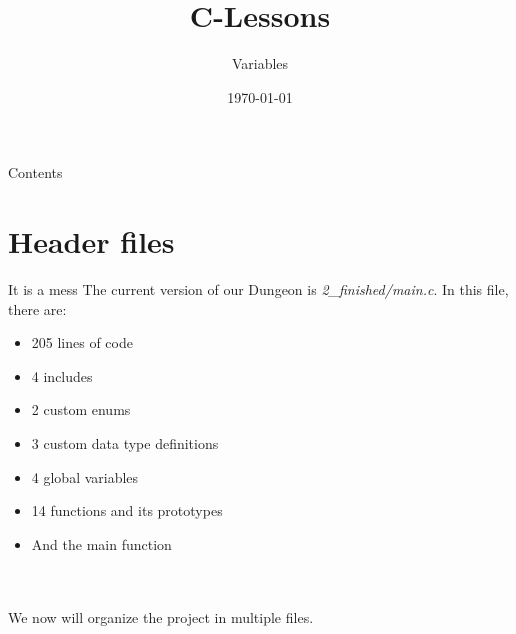 


\title{C-Lessons}
\subtitle{Variables}
\date{\today}





\maketitle

\begin{frame}{Contents}
	\tableofcontents
\end{frame}
\section{Header files}

\begin{frame}{It is a mess}
	The current version of our Dungeon is \textit{2\_finished/main.c}. In this file, there are:
	\begin{itemize}
		\item 205 lines of code
		\item 4 includes
		\item 2 custom enums
		\item 3 custom data type definitions
		\item 4 global variables
		\item 14 functions and its prototypes
		\item And the main function
	\end{itemize}\ \\\ \\
	We now will organize the project in multiple files.
\end{frame}


